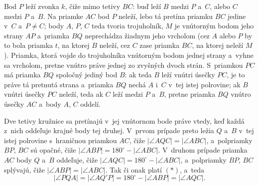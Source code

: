 {    Bod $P$ leží zvonka $k$, čiže mimo tetivy $BC$: buď leží $B$ medzi $P$ a~$C$, alebo $C$ medzi $P$ a~$B$. Na priamke $AC$ bod $P$ neleží, lebo tá pretína priamku $BC$ jedine v~$C$ a~$P \neq C$; body $A$, $P$, $C$ teda tvoria trojuholník, $M$ je vnútorným bodom jeho strany $AP$ a~priamka $BQ$ neprechádza žiadnym jeho vrcholom (cez $A$ alebo $P$ by to bola priamka $t$, na ktorej $B$ neleží, cez $C$ zase priamka $BC$, na ktorej neleží $M$). Priamka, ktorá vojde do trojuholníka vnútorným bodom jednej strany a~vyhne sa vrcholom, pretne vnútro práve jednej zo zvyšných dvoch strán. S~priamkou $PC$ má priamka $BQ$ spoločný jediný bod $B$: ak teda $B$ leží vnútri úsečky $PC$, je to práve tá pretnutá strana a~priamka $BQ$ nechá $A$ i~$C$ v~tej istej polrovine; ak $B$ vnútri úsečky $PC$ neleží, teda ak $C$ leží medzi $P$ a~$B$, pretne priamka $BQ$ vnútro úsečky $AC$ a~body $A$, $C$ oddelí.

    Dve tetivy kružnice sa pretínajú v~jej vnútornom bode práve vtedy, keď každá z~nich oddeľuje krajné body tej druhej. V~prvom prípade preto ležia $Q$ a~$B$ v~tej istej polrovine s~hraničnou priamkou $AC$, čiže $|\angle AQC| = |\angle ABC|$, a~polpriamky $BP$, $BC$ sú opačné, čiže $|\angle ABP| = 180^\circ - |\angle ABC|$. V~druhom prípade priamka $AC$ body $Q$ a~$B$ oddeľuje, čiže $|\angle AQC| = 180^\circ - |\angle ABC|$, a~polpriamky $BP$, $BC$ splývajú, čiže $|\angle ABP| = |\angle ABC|$. Tak či onak platí $(*)$, a~teda
    $$
    |\angle PQA| = |\angle AQ'P| = 180^\circ - |\angle ABP| = |\angle AQC|.
    $$
}

